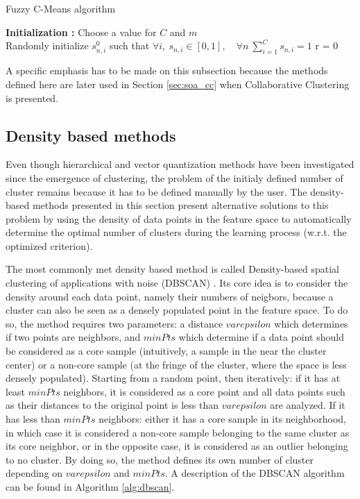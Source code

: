 \documentclass[a4paper]{report}
\begin{document}
    \begin{algorithm}
        \caption{Fuzzy C-Means algorithm}
        \label{alg:fcm}
        \textbf{Initialization :} Choose a value for $C$ and $m$\\
        Randomly initialize $s^0_{n,i}$ such that $\forall i, ~ s_{n,i} \in [0,1], \quad \forall n ~ \sum\limits_{i=1}^C s_{n,i} = 1$
        r = 0
    \end{algorithm}

    A specific emphasis has to be made on this subsection because the methods defined here are later used in Section \ref{sec:soa_cc} when Collaborative Clustering is presented.

    \subsection{Density based methods}

    Even though hierarchical and vector quantization methods have been investigated since the emergence of clustering, the problem of the initialy defined number of cluster remains because it has to be defined manually by the user. The density-based methods presented in this section present alternative solutions to this problem by using the density of data points in the feature space to automatically determine the optimal number of clusters during the learning process (w.r.t. the optimized criterion). 

    The most commonly met density based method is called Density-based spatial clustering of applications with noise (DBSCAN) \cite{ester1996density}. Its core idea is to consider the density around each data point, namely their numbers of neigbors, because a cluster can also be seen as a densely populated point in the feature space. To do so, the method requires two parameters: a distance $varepsilon$ which determines if two points are neighbors, and $minPts$ which determine if a data point should be considered as a core sample (intuitively, a sample in the near the cluster center) or a non-core sample (at the fringe of the cluster, where the space is less densely populated). Starting from a random point, then iteratively: if it has at least $minPts$ neighbors, it is considered as a core point and all data points such as their distances to the original point is less than $varepsilon$ are analyzed. If it has less than $minPts$ neighbors: either it has a core sample in its neighborhood, in which case it is considered a non-core sample belonging to the same cluster as its core neighbor, or in the opposite case, it is considered as an outlier belonging to no cluster. By doing so, the method defines its own number of cluster depending on $varepsilon$ and $minPts$. A description of the DBSCAN algorithm can be found in Algorithm \ref{alg:dbscan}. 
\end{document}
